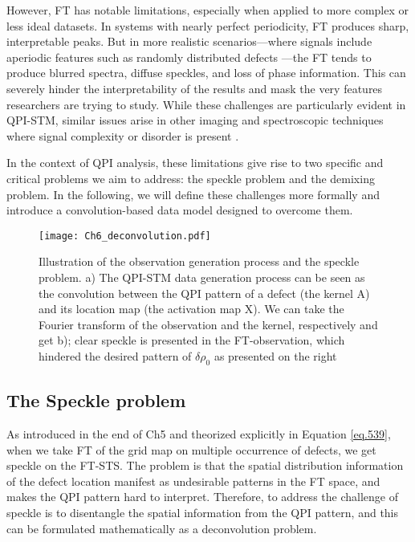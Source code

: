 However, FT has notable limitations, especially when applied to more complex or less ideal datasets. In systems with nearly perfect periodicity, FT produces sharp, interpretable peaks. But in more realistic scenarios—where signals include aperiodic features such as randomly distributed defects —the FT tends to produce blurred spectra, diffuse speckles, and loss of phase information. This can severely hinder the interpretability of the results and mask the very features researchers are trying to study. While these challenges are particularly evident in QPI-STM, similar issues arise in other imaging and spectroscopic techniques where signal complexity or disorder is present\cite{Bonnet 1997} \cite{Draijer 2009}.

In the context of QPI analysis, these limitations give rise to two specific and critical problems we aim to address: the speckle problem and the demixing problem. In the following, we will define these challenges more formally and introduce a convolution-based data model designed to overcome them.
\begin{figure}
	\texttt{[image: Ch6\_deconvolution.pdf]} 
	\centering
	\caption{Illustration of the observation generation process and the speckle problem. a) The QPI-STM data generation process can be seen as the convolution between the QPI pattern of a defect (the kernel A) and its location map (the activation map X). We can take the Fourier transform of the observation and the kernel, respectively and get b); clear speckle is presented in the FT-observation, which hindered the desired pattern of $\delta\rho_0$ as presented on the right}
	\label{fig:ch6_decon}
\end{figure}

\subsection{The Speckle problem}
As introduced in the end of Ch5 and theorized explicitly in Equation \ref{eq.539}, when we take \ac{FT} of the grid map on multiple occurrence of defects, we get speckle on the \ac{FT-STS}. The problem is that the spatial distribution information of the defect location manifest as undesirable patterns in the \ac{FT} space, and makes the QPI pattern hard to interpret. Therefore, to address the challenge of speckle is to disentangle the spatial information from the \ac{QPI} pattern, and this can be formulated mathematically as a deconvolution problem. 


